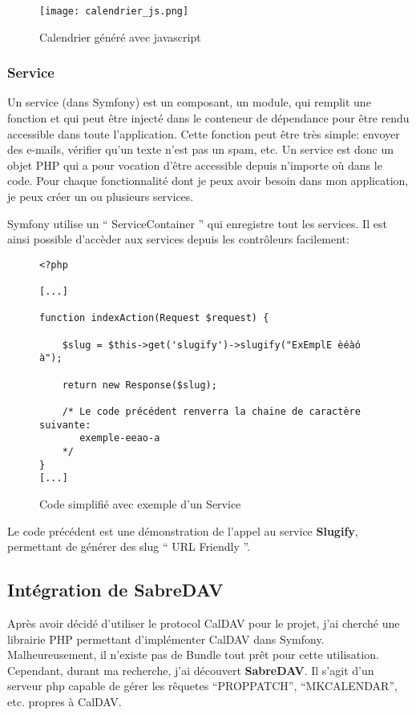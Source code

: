 \begin{figure}[H]
\begin{center}
\texttt{[image: calendrier\_js.png]}
\end{center}
\caption{Calendrier généré avec javascript}
\end{figure}

\subsubsection*{Service}

Un service (dans Symfony) est un composant, un module, qui remplit une fonction et qui peut être injecté dans le conteneur de dépendance pour être rendu accessible dans toute l'application. Cette fonction peut être très simple: envoyer des e-mails, vérifier qu'un texte n'est pas un spam, etc. Un service est donc un objet PHP qui a pour vocation d'être accessible depuis n'importe où dans le code. Pour chaque fonctionnalité dont je peux avoir besoin dans mon application, je peux créer un ou plusieurs services.

Symfony utilise un `` ServiceContainer '' qui enregistre tout les services. Il est ainsi possible d'accèder aux services depuis les contrôleurs facilement:

\begin{figure}[H]
\begin{lstlisting}[frame=single]
<?php

[...]

function indexAction(Request $request) {

    $slug = $this->get('slugify')->slugify("ExEmplE èéàó à");

    return new Response($slug);

    /* Le code précédent renverra la chaine de caractère suivante:
       exemple-eeao-a
    */
}
[...]

\end{lstlisting}
\caption{Code simplifié avec exemple d'un Service}
\end{figure}

Le code précédent est une démonstration de l'appel au service \textbf{Slugify}, permettant de générer des slug `` URL Friendly ''.

\subsection{Intégration de SabreDAV}

Après avoir décidé d'utiliser le protocol CalDAV pour le projet, j'ai cherché une librairie PHP permettant d'implémenter CalDAV dans Symfony. Malheureusement, il n'existe pas de Bundle tout prêt pour cette utilisation. Cependant, durant ma recherche, j'ai découvert \textbf{SabreDAV}. Il s'agit d'un serveur php capable de gérer les rêquetes ``PROPPATCH'', ``MKCALENDAR'', etc. propres à CalDAV.

